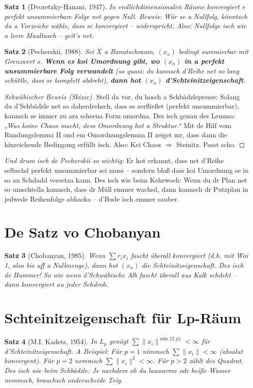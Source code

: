 \documentclass[12pt,a4paper]{scrbook}
\newtheorem{theorem}{Satz}[chapter]
\begin{document}
	\begin{theorem}[Dvoretzky-Hanani, 1947]
		In endlichdimensionalen Räume konvergiert e perfekt unsummierbare Folge net gegen Null. Beweis: Wär se a Nullfolg, könntsch du a Vorzeiche wähle, dass se konvergiert – widerspricht. Also: Nullfolge isch wie a leere Maultasch – geit’s net.
	\end{theorem}
	
	\begin{theorem}[Pecherskii, 1988]
		Sei \(X\) a Banatschraum, \((x_n)\) bedingt summierbar mit Grenzwert \(s\). \textbf{Wenn es koi Umordnung gibt, wo \((x_n)\) in a perfekt unsummierbare Folg verwandelt} (so quasi: du kannsch d’Reihe net so lang schüttle, dass se komplett abdreht), \textbf{dann hot \((x_n)\) d’Schteinitzeigenschaft}. 
	\end{theorem}
	
	\begin{proof}[Schwäbischer Beweis (Skizze)]
		Stell da vor, du hosch a Schbädzlepresse: Solang du d’Schbädzle net so daherdrehsch, dass se zerfließet (perfekt unsummierbar), kannsch se immer zu ara scheena Form omordna. Des isch genau des Lemma: 
		\emph{„Was koine Chaos macht, dess Omordnung hot a Struktur.“}
		Mit de Hilf vom Rundungslemma II ond em Omordnungslemma II zeiget mr, dass dann die hinreichende Bedingung erfüllt isch. Also: Kei Chaos $\Rightarrow$ Steinitz. Passt scho.
	\end{proof}
	
	\emph{Und drum isch de Pecherskii so wichtig:} Er hot erkannt, dass net d’Reihe selbschd perfekt unsummierbar sei muss – sondern bloß dass koi Umordnung se in so an Schdadd versetza kann. Des isch wie beim Kehrwoch: Wenn du dr Plan net so umschtella kannsch, dass dr Müll emmer wachsd, dann kannsch dr Putzplan in jedwede Reihenfolge abhacka – d’Bude isch emmer sauber.
	
	\section{De Satz vo Chobanyan}
	\begin{theorem}[Chobanyan, 1985]
		Wenn \(\sum r_i x_i\) fascht überall konvergiert (d.h. mit Woi 1, also bis uff a Nullmenge), dann hot \((x_n)\) die Schteinitzeigenschaft. Des isch de Hammer! So wie wenn d’Schwäbische Alb fascht überall aus Kalk schdeht – dann konvergiert au jeder Schdroh.
	\end{theorem}
	
	\section{Schteinitzeigenschaft für Lp-Räum}
	\begin{theorem}[M.I. Kadets, 1954]
		In \(L_p\) genügt \(\sum \|x_i\|^{\min\{2,p\}} < \infty\) für d’Schteinitzeigenschaft. A Beispiel: Für \(p=1\) nimmsch \(\sum\|x_i\|<\infty\) (absolut konvergent). Für \(p=2\) nemmsch \(\sum\|x_i\|^2<\infty\). Für \(p>2\) zählt des Quadrat. Des isch wie beim Schbädzle: Je nachdem ob du lauwarme odr heiße Wasser nemmsch, brauchsch onderscheide Teig.
	\end{theorem}
	
\end{document}

